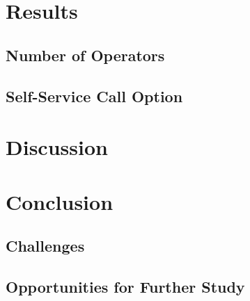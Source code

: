 \documentclass[12pt,twocolumn]{article}
\begin{document}
\section{Results}

	\subsection{Number of Operators}
	
	
	\subsection{Self-Service Call Option}

\section{Discussion}



\section{Conclusion}

	\subsection{Challenges}

	\subsection{Opportunities for Further Study}
\end{document}
